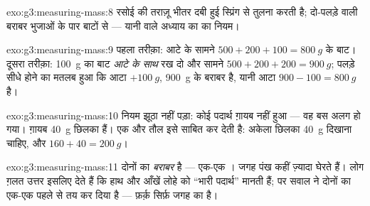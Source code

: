 \begin{solution}{exo:g3:measuring-mass:8}
रसोई की तराज़ू भीतर दबी हुई स्प्रिंग से तुलना करती है; दो-पलड़े वाली
 बराबर भुजाओं के पार बाटों से --- यानी  वाले अध्याय का
 का नियम।
\end{solution}

\begin{solution}{exo:g3:measuring-mass:9}
पहला तरीक़ा: आटे के सामने $500 + 200 + 100 = \qty{800}{g}$ के बाट।
दूसरा तरीक़ा: \qty{100}{g} का बाट \emph{आटे के साथ} रख दो और सामने
$500 + 200 + 200 = \qty{900}{g}$; पलड़े सीधे होने का मतलब हुआ कि
आटा $+ \qty{100}{g}$, \qty{900}{g} के बराबर है, यानी आटा
$900 - 100 = \qty{800}{g}$ है।
\end{solution}

\begin{solution}{exo:g3:measuring-mass:10}
नियम झूठा नहीं पड़ा: कोई पदार्थ ग़ायब नहीं हुआ --- वह बस अलग हो गया।
ग़ायब \qty{40}{g} छिलका हैं। एक और तौल इसे साबित कर देती है: अकेला
छिलका \qty{40}{g} दिखाना चाहिए, और $160 + 40 = \qty{200}{g}$।
\end{solution}

\begin{solution}{exo:g3:measuring-mass:11}
दोनों का  \emph{बराबर} है --- एक-एक । जगह पंख कहीं
ज़्यादा घेरते हैं। लोग ग़लत उत्तर इसलिए देते हैं कि हाथ और आँखें लोहे
को ``भारी पदार्थ'' मानती हैं; पर सवाल ने दोनों का  एक-एक
 पहले से तय कर दिया है --- फ़र्क़ सिर्फ़ जगह का है।
\end{solution}
